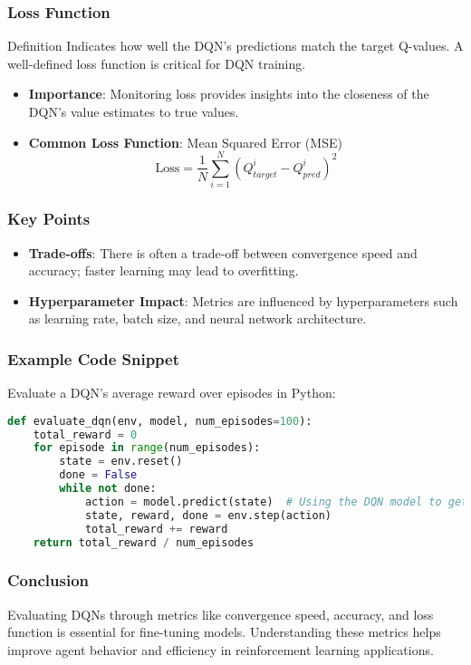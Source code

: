 \documentclass[aspectratio=169]{beamer}
\begin{document}
\begin{frame}
    \frametitle{Loss Function}
    \begin{block}{Definition}
        Indicates how well the DQN’s predictions match the target Q-values. A well-defined loss function is critical for DQN training.
    \end{block}
    \begin{itemize}
        \item \textbf{Importance}: Monitoring loss provides insights into the closeness of the DQN's value estimates to true values.
        \item \textbf{Common Loss Function}: Mean Squared Error (MSE)
        \begin{equation}
            \text{Loss} = \frac{1}{N} \sum_{i=1}^{N} (Q_{target}^i - Q_{pred}^i)^2
        \end{equation}
    \end{itemize}
\end{frame}

\begin{frame}
    \frametitle{Key Points}
    \begin{itemize}
        \item \textbf{Trade-offs}: There is often a trade-off between convergence speed and accuracy; faster learning may lead to overfitting.
        \item \textbf{Hyperparameter Impact}: Metrics are influenced by hyperparameters such as learning rate, batch size, and neural network architecture.
    \end{itemize}
\end{frame}

\begin{frame}[fragile]
    \frametitle{Example Code Snippet}
    Evaluate a DQN’s average reward over episodes in Python:
    \begin{lstlisting}[language=Python]
def evaluate_dqn(env, model, num_episodes=100):
    total_reward = 0
    for episode in range(num_episodes):
        state = env.reset()
        done = False
        while not done:
            action = model.predict(state)  # Using the DQN model to get the action
            state, reward, done = env.step(action)
            total_reward += reward
    return total_reward / num_episodes
    \end{lstlisting}
\end{frame}

\begin{frame}
    \frametitle{Conclusion}
    Evaluating DQNs through metrics like convergence speed, accuracy, and loss function is essential for fine-tuning models. Understanding these metrics helps improve agent behavior and efficiency in reinforcement learning applications.
\end{frame}
\end{document}
